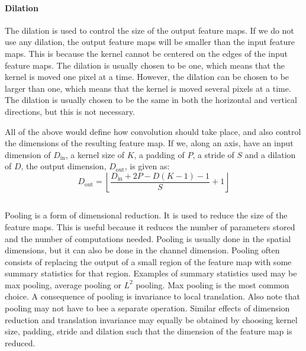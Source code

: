         \paragraph{Dilation}
            The dilation is used to control the size of the output feature maps. If we do not use any dilation, the output feature maps will be smaller than the input feature maps. This is because the kernel cannot be centered on the edges of the input feature maps. The dilation is usually chosen to be one, which means that the kernel is moved one pixel at a time. However, the dilation can be chosen to be larger than one, which means that the kernel is moved several pixels at a time. The dilation is usually chosen to be the same in both the horizontal and vertical directions, but this is not necessary.

        All of the above would define how convolution should take place, and also control the dimensions of the resulting feature map. If we, along an axis, have an input dimension of $D_\mathrm{in}$, a kernel size of $K$, a padding of $P$, a stride of $S$ and a dilation of $D$, the output dimension, $D_\mathrm{out}$, is given as:
        \begin{equation}
            D_\mathrm{out} = \left\lfloor {\frac{D_\mathrm{in} + 2P-D(K-1)-1}{S}+1} \right\rfloor
        \end{equation}
    \subsection{}
        Pooling is a form of dimensional reduction. It is used to reduce the size of the feature maps. This is useful because it reduces the number of parameters stored and the number of computations needed. Pooling is usually done in the spatial dimensions, but it can also be done in the channel dimension. Pooling often consists of replacing the output of a small region of the feature map with some summary statistics for that region. Examples of summary statistics used may be max pooling, average pooling or $L^2$ pooling. Max pooling is the most common choice. A consequence of pooling is invariance to local translation. Also note that pooling may not have to bee a separate operation. Similar effects of dimension reduction and translation invariance may equally be obtained by choosing kernel size, padding, stride and dilation such that the dimension of the feature map is reduced. 
